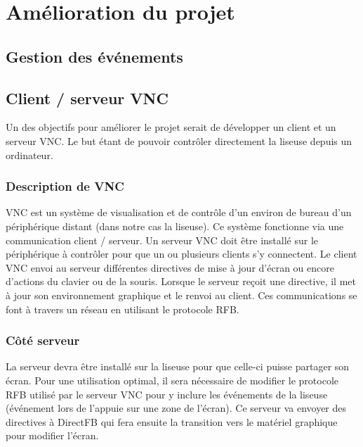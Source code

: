 \chapter{Amélioration du projet}





\section{Gestion des événements}



\section{Client / serveur VNC}

Un des objectifs pour améliorer le projet serait de développer un client et un serveur VNC. Le but étant de pouvoir contrôler directement la liseuse depuis un ordinateur.

\subsection{Description de VNC}

VNC est un système de visualisation et de contrôle d'un environ de bureau d'un périphérique distant (dans notre cas la liseuse). Ce système fonctionne via une communication client / serveur. Un serveur VNC doit être installé sur le périphérique à contrôler pour que un ou plusieurs clients s'y connectent. Le client VNC envoi au serveur différentes directives de mise à jour d'écran ou encore d'actions du clavier ou de la souris. Lorsque le serveur reçoit une directive, il met à jour son environnement graphique et le renvoi au client. Ces communications se font à travers un réseau en utilisant le protocole RFB.

\subsection{Côté serveur}

La serveur devra être installé sur la liseuse pour que celle-ci puisse partager son écran. Pour une utilisation optimal, il sera nécessaire de modifier le protocole RFB utilisé par le serveur VNC pour y inclure les événements de la liseuse (événement lors de l'appuie sur une zone de l'écran). Ce serveur va envoyer des directives à DirectFB qui fera ensuite la transition vers le matériel graphique pour modifier l'écran.


